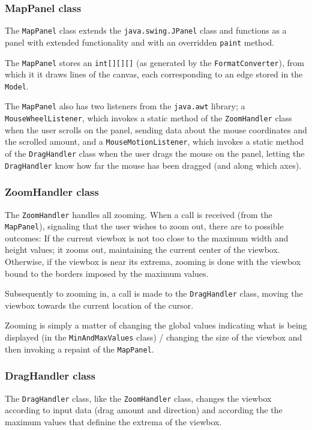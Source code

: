 \documentclass[a4paper,11pt]{article}
\begin{document}
\subsubsection{MapPanel class} %
The \texttt{MapPanel} class extends the \texttt{java.swing.JPanel} class and functions as a panel with extended functionality and with an overridden \texttt{paint} method.

The \texttt{MapPanel} stores an \texttt{int[][][]} (as generated by the \texttt{FormatConverter}), from which it it draws lines of the canvas, each corresponding to an edge stored in the \texttt{Model}.

The \texttt{MapPanel} also has two listeners from the \texttt{java.awt} library; a \texttt{MouseWheelListener}, which invokes a static method of the \texttt{ZoomHandler} class when the user scrolls on the panel, sending data about the mouse coordinates and the scrolled amount, and a \texttt{MouseMotionListener}, which invokes a static method of the \texttt{DragHandler} class when the user drags the mouse on the panel, letting the \texttt{DragHandler} know how far the mouse has been dragged (and along which axes).

\subsubsection{ZoomHandler class} %
The \texttt{ZoomHandler} handles all zooming. When a call is received (from the \texttt{MapPanel}), signaling that the user wishes to zoom out, there are to possible outcomes: If the current viewbox is not too close to the maximum width and height values; it zooms out, maintaining the current center of the viewbox. Otherwise, if the viewbox is near its extrema, zooming is done with the viewbox bound to the borders imposed by the maximum values.

Subsequently to zooming in, a call is made to the \texttt{DragHandler} class, moving the viewbox towards the current location of the cursor.

Zooming is simply a matter of changing the global values indicating what is being displayed (in the \texttt{MinAndMaxValues} class) / changing the size of the viewbox and then invoking a repaint of the \texttt{MapPanel}.

\subsubsection{DragHandler class} %
The \texttt{DragHandler} class, like the \texttt{ZoomHandler} class, changes the viewbox according to input data (drag amount and direction) and according the the maximum values that definine the extrema of the viewbox.
\end{document}
